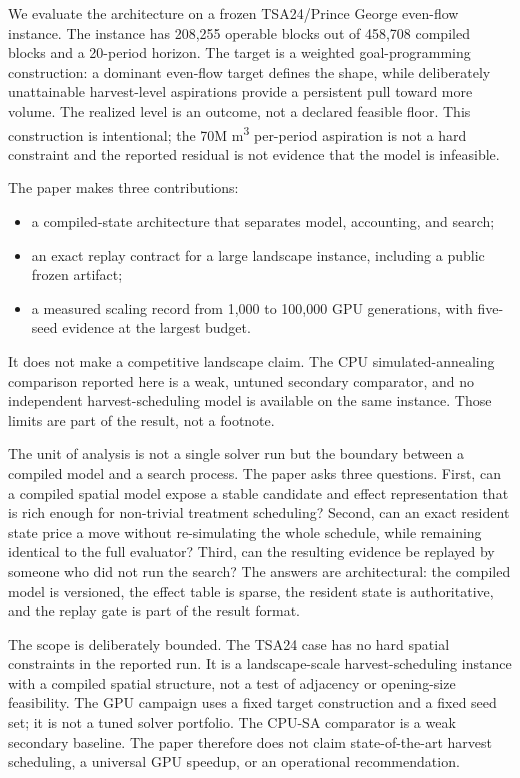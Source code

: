 \documentclass[preprint,11pt]{elsarticle}
\providecommand{\tightlist}{\setlength{\itemsep}{0pt}\setlength{\parskip}{0pt}}
\begin{document}
We evaluate the architecture on a frozen TSA24/Prince George even-flow instance. The instance has 208,255 operable blocks out of 458,708 compiled blocks and a 20-period horizon. The target is a weighted goal-programming construction: a dominant even-flow target defines the shape, while deliberately unattainable harvest-level aspirations provide a persistent pull toward more volume. The realized level is an outcome, not a declared feasible floor. This construction is intentional; the 70M m\textsuperscript{3} per-period aspiration is not a hard constraint and the reported residual is not evidence that the model is infeasible.

The paper makes three contributions:

\begin{itemize}
\tightlist
\item
  a compiled-state architecture that separates model, accounting, and search;
\item
  an exact replay contract for a large landscape instance, including a public frozen artifact;
\item
  a measured scaling record from 1,000 to 100,000 GPU generations, with five-seed evidence at the largest budget.
\end{itemize}

It does not make a competitive landscape claim. The CPU simulated-annealing comparison reported here is a weak, untuned secondary comparator, and no independent harvest-scheduling model is available on the same instance. Those limits are part of the result, not a footnote.

The unit of analysis is not a single solver run but the boundary between a compiled model and a
search process. The paper asks three questions. First, can a compiled spatial model expose a stable
candidate and effect representation that is rich enough for non-trivial treatment scheduling? Second,
can an exact resident state price a move without re-simulating the whole schedule, while remaining
identical to the full evaluator? Third, can the resulting evidence be replayed by someone who did
not run the search? The answers are architectural: the compiled model is versioned, the effect table
is sparse, the resident state is authoritative, and the replay gate is part of the result format.

The scope is deliberately bounded. The TSA24 case has no hard spatial constraints in the reported
run. It is a landscape-scale harvest-scheduling instance with a compiled spatial structure, not a
test of adjacency or opening-size feasibility. The GPU campaign uses a fixed target construction and
a fixed seed set; it is not a tuned solver portfolio. The CPU-SA comparator is a weak secondary
baseline. The paper therefore does not claim state-of-the-art harvest scheduling, a universal GPU
speedup, or an operational recommendation.
\end{document}
